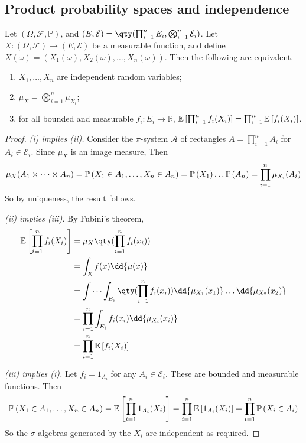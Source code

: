 \subsection{Product probability spaces and independence}
\begin{proposition}
	Let $(\Omega, \mathcal F, \mathbb P)$, and $(E, \mathcal E) = \qty(\prod_{i=1}^n E_i, \bigotimes_{i=1}^n \mathcal E_i)$.
	Let $X \colon (\Omega, \mathcal F) \to (E, \mathcal E)$ be a measurable function, and define $X(\omega) = (X_1(\omega), X_2(\omega), \dots, X_n(\omega))$.
	Then the following are equivalent.
	\begin{enumerate}
		\item $X_1, \dots, X_n$ are independent random variables;
		\item $\mu_X = \bigotimes_{i=1}^n \mu_{X_i}$;
		\item for all bounded and measurable $f_i \colon E_i \to \mathbb R$, $\mathbb{E}\left[{\prod_{i=1}^n f_i(X_i)}\right] = \prod_{i=1}^n \mathbb{E}\left[{f_i(X_i)}\right]$.
	\end{enumerate}
\end{proposition}
\begin{proof}
	\emph{(i) implies (ii).}
	Consider the $\pi$-system $\mathcal A$ of rectangles $A = \prod_{i=1}^n A_i$ for $A_i \in \mathcal E_i$.
	Since $\mu_X$ is an image measure,
	Then
	\[ \mu_X(A_1 \times \dots \times A_n) = \mathbb{P}\left({X_1 \in A_1, \dots, X_n \in A_n}\right) = \mathbb{P}\left({X_1}\right) \dots \mathbb{P}\left({A_n}\right) = \prod_{i=1}^n \mu_{X_i}(A_i) \]
	So by uniqueness, the result follows.

	\emph{(ii) implies (iii).}
	By Fubini's theorem,
	\begin{align*}
		\expect{\prod_{i=1}^n f_i(X_i)} &= \mu_X\qty(\prod_{i=1}^n f_i(x_i)) \\
		&= \int_E f(x) \dd{\mu(x)} \\
		&= \idotsint_{E_i} \qty(\prod_{i=1}^n f_i(x_i)) \dd{\mu_{X_1}(x_1)} \dots \dd{\mu_{X_2}(x_2)} \\
		&= \prod_{i=1}^n \int_{E_i} f_i(x_i) \dd{\mu_{X_i}(x_i)} \\
		&= \prod_{i=1}^n \expect{f_i(X_i)}
	\end{align*}

	\emph{(iii) implies (i).}
	Let $f_i = 1_{A_i}$ for any $A_i \in \mathcal E_i$.
	These are bounded and measurable functions.
	Then
	\[ \mathbb{P}\left({X_1 \in A_1, \dots, X_n \in A_n}\right) = \mathbb{E}\left[{\prod_{i=1}^n 1_{A_i}(X_i)}\right] = \prod_{i=1}^n \mathbb{E}\left[{1_{A_i}(X_i)}\right] = \prod_{i=1}^n \mathbb{P}\left({X_i \in A_i}\right) \]
	So the $\sigma$-algebras generated by the $X_i$ are independent as required.
\end{proof}
